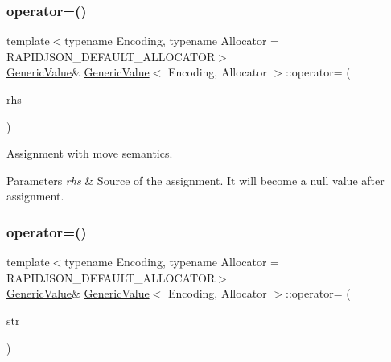 \mbox{\label{classGenericValue_a9018a40d7c52efc00daf803c51d3236c}} 
\subsubsection{\texorpdfstring{operator=()}{operator=()}\hspace{0.1cm}{\footnotesize\ttfamily [1/2]}}
{\footnotesize\ttfamily template$<$typename Encoding, typename Allocator = R\+A\+P\+I\+D\+J\+S\+O\+N\+\_\+\+D\+E\+F\+A\+U\+L\+T\+\_\+\+A\+L\+L\+O\+C\+A\+T\+OR$>$ \\
\hyperlink{classGenericValue}{Generic\+Value}\& \hyperlink{classGenericValue}{Generic\+Value}$<$ Encoding, Allocator $>$\+::operator= (\begin{DoxyParamCaption}\item[{\hyperlink{classGenericValue}{Generic\+Value}$<$ Encoding, Allocator $>$ \&}]{rhs }\end{DoxyParamCaption})\hspace{0.3cm}{\ttfamily [inline]}}



Assignment with move semantics. 


\begin{DoxyParams}{Parameters}
{\em rhs} & Source of the assignment. It will become a null value after assignment. \\
\hline
\end{DoxyParams}
\mbox{\label{classGenericValue_a386708557555e6389184de608af5e6a6}} 
\subsubsection{\texorpdfstring{operator=()}{operator=()}\hspace{0.1cm}{\footnotesize\ttfamily [2/2]}}
{\footnotesize\ttfamily template$<$typename Encoding, typename Allocator = R\+A\+P\+I\+D\+J\+S\+O\+N\+\_\+\+D\+E\+F\+A\+U\+L\+T\+\_\+\+A\+L\+L\+O\+C\+A\+T\+OR$>$ \\
\hyperlink{classGenericValue}{Generic\+Value}\& \hyperlink{classGenericValue}{Generic\+Value}$<$ Encoding, Allocator $>$\+::operator= (\begin{DoxyParamCaption}\item[{\hyperlink{classGenericValue_a32e0f30ee278072374c8168b14d3317f}{String\+Ref\+Type}}]{str }\end{DoxyParamCaption})\hspace{0.3cm}{\ttfamily [inline]}}



